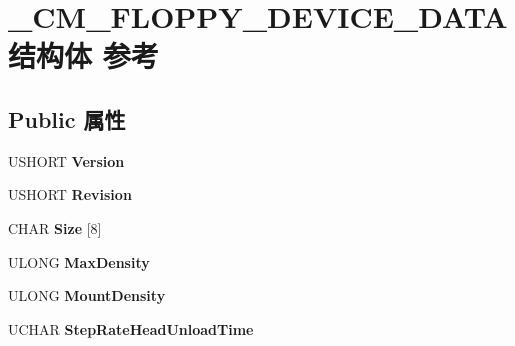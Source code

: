 \hypertarget{struct___c_m___f_l_o_p_p_y___d_e_v_i_c_e___d_a_t_a}{}\section{\+\_\+\+C\+M\+\_\+\+F\+L\+O\+P\+P\+Y\+\_\+\+D\+E\+V\+I\+C\+E\+\_\+\+D\+A\+T\+A结构体 参考}
\label{struct___c_m___f_l_o_p_p_y___d_e_v_i_c_e___d_a_t_a}
\subsection*{Public 属性}
\begin{DoxyCompactItemize}
\item 
\mbox{\label{struct___c_m___f_l_o_p_p_y___d_e_v_i_c_e___d_a_t_a_a01b64ec4aa773307962ac2fd42d8f086}} 
U\+S\+H\+O\+RT {\bfseries Version}
\item 
\mbox{\label{struct___c_m___f_l_o_p_p_y___d_e_v_i_c_e___d_a_t_a_adf35b09117dab0290ec56436eaa1dfd2}} 
U\+S\+H\+O\+RT {\bfseries Revision}
\item 
\mbox{\label{struct___c_m___f_l_o_p_p_y___d_e_v_i_c_e___d_a_t_a_aa7672fe81c4ff0f0d37d955784d7c9e0}} 
C\+H\+AR {\bfseries Size} \mbox{[}8\mbox{]}
\item 
\mbox{\label{struct___c_m___f_l_o_p_p_y___d_e_v_i_c_e___d_a_t_a_a94325cf18dda46e4560830317994484e}} 
U\+L\+O\+NG {\bfseries Max\+Density}
\item 
\mbox{\label{struct___c_m___f_l_o_p_p_y___d_e_v_i_c_e___d_a_t_a_a393755bea61e19f759aaf3e5ac0734e2}} 
U\+L\+O\+NG {\bfseries Mount\+Density}
\item 
\mbox{\label{struct___c_m___f_l_o_p_p_y___d_e_v_i_c_e___d_a_t_a_a95b04379019352dbfca589566ccf3a3b}} 
U\+C\+H\+AR {\bfseries Step\+Rate\+Head\+Unload\+Time}
\item 
\mbox{\label{struct___c_m___f_l_o_p_p_y___d_e_v_i_c_e___d_a_t_a_ac9bae5dbe752aa02df8a17ab6b57f707}} 

\end{DoxyCompactItemize}
